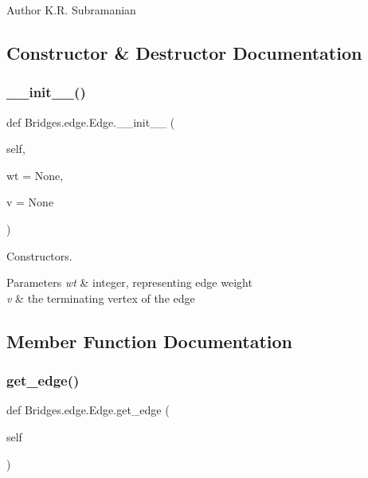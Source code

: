 \begin{DoxyAuthor}{Author}
K.\+R. Subramanian 
\end{DoxyAuthor}


\subsection{Constructor \& Destructor Documentation}
\mbox{\label{class_bridges_1_1edge_1_1_edge_a312209cb99ae753de7ad34818b095dfc}} 
\subsubsection{\texorpdfstring{\+\_\+\+\_\+init\+\_\+\+\_\+()}{\_\_init\_\_()}}
{\footnotesize\ttfamily def Bridges.\+edge.\+Edge.\+\_\+\+\_\+init\+\_\+\+\_\+ (\begin{DoxyParamCaption}\item[{}]{self,  }\item[{}]{wt = {\ttfamily None},  }\item[{}]{v = {\ttfamily None} }\end{DoxyParamCaption})}



Constructors. 


\begin{DoxyParams}{Parameters}
{\em wt} & integer, representing edge weight \\
\hline
{\em v} & the terminating vertex of the edge \\
\hline
\end{DoxyParams}


\subsection{Member Function Documentation}
\mbox{\label{class_bridges_1_1edge_1_1_edge_a00fbdf3e8b0e05e00647cd2a32b25beb}} 
\subsubsection{\texorpdfstring{get\+\_\+edge()}{get\_edge()}}
{\footnotesize\ttfamily def Bridges.\+edge.\+Edge.\+get\+\_\+edge (\begin{DoxyParamCaption}\item[{}]{self }\end{DoxyParamCaption})}



